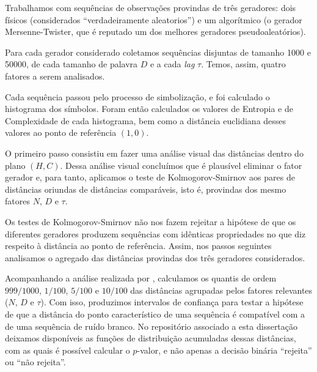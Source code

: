 

\begin{center}
\end{center}

Trabalhamos com sequências de observações provindas de três geradores: dois físicos (considerados ``verdadeiramente aleatorios'') e um algorítmico (o gerador Mersenne-Twister, que é reputado um dos melhores geradores pseudoaleatórios).

Para cada gerador considerado coletamos sequências disjuntas de tamanho \num{1000} e \num{50000}, de cada tamanho de palavra $D$ e a cada \textit{lag} $\tau$.
Temos, assim, quatro fatores a serem analisados.

Cada sequência passou pelo processo de simbolização, e foi calculado o histograma dos símbolos.
Foram então calculados os valores de Entropia e de Complexidade de cada histograma, bem como a distância euclidiana desses valores ao ponto de referência $(1,0)$.

O primeiro passo consistiu em fazer uma análise visual das distâncias dentro do plano $(H,C)$.
Dessa análise visual concluímos que é plausível eliminar o fator gerador e, para tanto, aplicamos o teste de Kolmogorov-Smirnov aos pares de distâncias oriundas de distâncias comparáveis, isto é, provindas dos mesmo fatores $N$, $D$ e $\tau$.

Os testes de Kolmogorov-Smirnov não nos fazem rejeitar a hipótese de que os diferentes geradores produzem sequências com idênticas propriedades no que diz respeito à distância ao ponto de referência.
Assim, nos passos seguintes analisamos o agregado das distâncias provindas dos três geradores considerados.

Acompanhando a análise realizada por \citet{NewPermutationEntropy}, calculamos os quantis de ordem $999/1000$, $1/100$, $5/100$ e $10/100$ das distâncias agrupadas pelos fatores relevantes ($N$, $D$ e $\tau$).
Com isso, produzimos intervalos de confiança para testar a hipótese de que a
distância do ponto característico de uma sequência é compatível com a de uma sequência de ruído branco.
No repositório associado a esta dissertação deixamos disponíveis as funções de distribuição acumuladas dessas distâncias, com as quais é possível calcular o $p$-valor, e não apenas a decisão binária ``rejeita'' ou ``não rejeita''.

